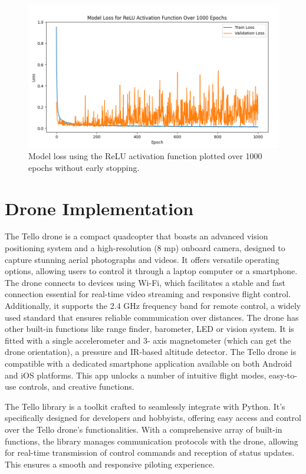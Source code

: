 \begin{figure}[ht!]
	\centering
	\includegraphics[width=\textwidth]{images/model_loss_over_1000_epochs.png}
	\caption{Model loss using the ReLU activation function plotted over 1000 epochs without early stopping.}
	\label{fig:epochs}
\end{figure}



\section{Drone Implementation}

The Tello drone is a compact quadcopter that boasts an advanced vision positioning system and a high-resolution (8 mp) onboard camera, designed to capture stunning aerial photographs and videos. It offers versatile operating options, allowing users to control it through a laptop computer or a smartphone. The drone connects to devices using Wi-Fi, which facilitates a stable and fast connection essential for real-time video streaming and responsive flight control. Additionally, it supports the 2.4 GHz frequency band for remote control, a widely used standard that ensures reliable communication over distances. The drone has other built-in functions like range finder, barometer, LED or vision system. It is fitted with a single accelerometer and 3- axis magnetometer (which can get the drone orientation), a pressure
and IR-based altitude detector. The Tello drone is compatible with a dedicated smartphone application available on both Android and iOS platforms. This app unlocks a number of intuitive flight modes, easy-to-use controls, and creative functions.

The Tello library is a toolkit crafted to seamlessly integrate with Python. It's specifically designed for developers and hobbyists, offering easy access and control over the Tello drone's functionalities. With a comprehensive array of built-in functions, the library manages communication protocols with the drone, allowing for real-time transmission of control commands and reception of status updates. This ensures a smooth and responsive piloting experience.


